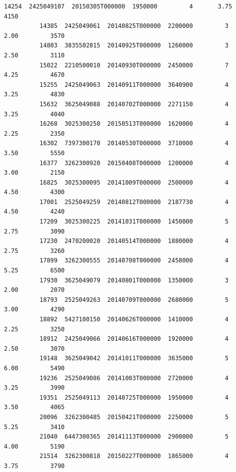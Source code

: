 \documentclass[11pt]{article}
\begin{document}
\begin{Verbatim}[commandchars=\\\{\}]
          14254  2425049107  20150305T000000  1950000         4       3.75         4150   
          14385  2425049061  20140825T000000  2200000         3       2.00         3570   
          14803  3835502815  20140925T000000  1260000         3       2.50         3110   
          15022  2210500010  20140930T000000  2450000         7       4.25         4670   
          15255  2425049063  20140911T000000  3640900         4       3.25         4830   
          15632  3625049088  20140702T000000  2271150         4       3.25         4040   
          16268  3025300250  20150513T000000  1620000         4       2.25         2350   
          16302  7397300170  20140530T000000  3710000         4       3.50         5550   
          16377  3262300920  20150408T000000  1200000         4       3.00         2150   
          16825  3025300095  20141009T000000  2500000         4       4.50         4300   
          17001  2525049259  20140812T000000  2187730         4       4.50         4240   
          17209  3025300225  20141031T000000  1450000         5       2.75         3090   
          17230  2470200020  20140514T000000  1880000         4       2.75         3260   
          17899  3262300555  20140708T000000  2458000         4       5.25         6500   
          17930  3625049079  20140801T000000  1350000         3       2.00         2070   
          18793  2525049263  20140709T000000  2680000         5       3.00         4290   
          18892  5427100150  20140626T000000  1410000         4       2.25         3250   
          18912  2425049066  20140616T000000  1920000         4       2.50         3070   
          19148  3625049042  20141011T000000  3635000         5       6.00         5490   
          19236  2525049086  20141003T000000  2720000         4       3.25         3990   
          19351  2525049113  20140725T000000  1950000         4       3.50         4065   
          20096  3262300485  20150421T000000  2250000         5       5.25         3410   
          21040  6447300365  20141113T000000  2900000         5       4.00         5190   
          21514  3262300818  20150227T000000  1865000         4       3.75         3790   
          

\end{Verbatim}
\end{document}
